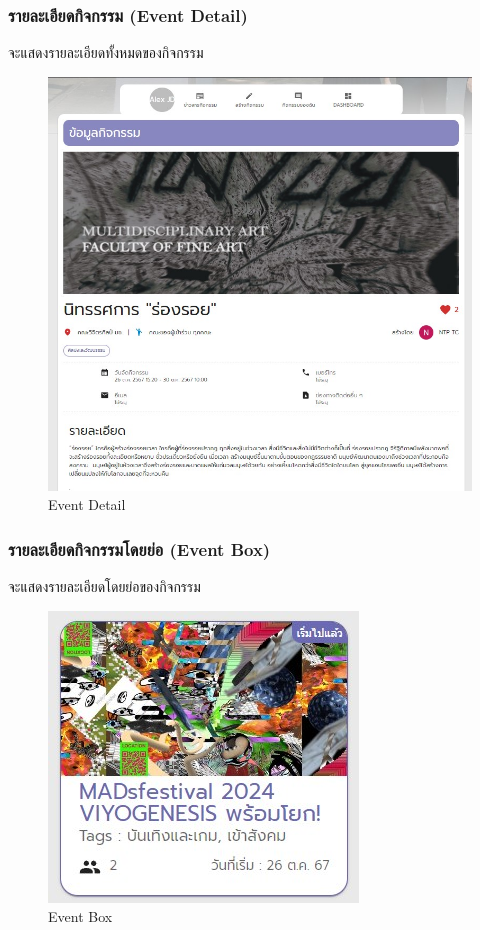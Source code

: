 \subsubsection{รายละเอียดกิจกรรม (Event Detail)}
จะแสดงรายละเอียดทั้งหมดของกิจกรรม
\begin{figure}[H]
\begin{center}
\includegraphics[scale=0.6]{public/act-detail.jpg}
\end{center}
\caption[Poem]{Event Detail}
\label{fig:event-detail}
\end{figure}
\subsubsection{รายละเอียดกิจกรรมโดยย่อ (Event Box)}
จะแสดงรายละเอียดโดยย่อของกิจกรรม
\begin{figure}[H]
\begin{center}
\includegraphics[scale=0.8]{public/act-mini.jpg}
\end{center}
\caption[Poem]{Event Box}
\label{fig:event-box}
\end{figure}
\clearpage
